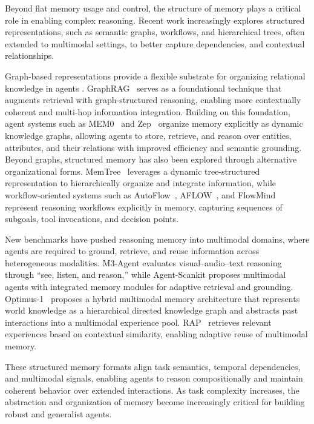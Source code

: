 Beyond flat memory usage and control, the structure of memory plays a critical role in enabling complex reasoning. Recent work increasingly explores structured representations, such as semantic graphs, workflows, and hierarchical trees, often extended to multimodal settings, to better capture dependencies, and contextual relationships.

Graph-based representations provide a flexible substrate for organizing relational knowledge in agents \cite{Ouyang2024RepoGraphEA}. GraphRAG~\cite{Edge2024FromLT} serves as a foundational technique that augments retrieval with graph-structured reasoning, enabling more contextually coherent and multi-hop information integration. Building on this foundation, agent systems such as MEM0~\cite{chhikara2025mem0} and Zep~\cite{rasmussen2025zep} organize memory explicitly as dynamic knowledge graphs, allowing agents to store, retrieve, and reason over entities, attributes, and their relations with improved efficiency and semantic grounding. Beyond graphs, structured memory has also been explored through alternative organizational forms. MemTree~\cite{rezazadeh2024isolated} leverages a dynamic tree-structured representation to hierarchically organize and integrate information, while workflow-oriented systems such as AutoFlow~\cite{Li2024AutoFlowAW}, AFLOW~\cite{zhang2024aflow}, and FlowMind~\cite{Zeng2023FlowMindAW} represent reasoning workflows explicitly in memory, capturing sequences of subgoals, tool invocations, and decision points.

New benchmarks have pushed reasoning memory into multimodal domains, where agents are required to ground, retrieve, and reuse information across heterogeneous modalities. M3-Agent \cite{long2025seeing} evaluates visual–audio–text reasoning through “see, listen, and reason,” while Agent-Scankit \cite{cheng2025agent} proposes multimodal agents with integrated memory modules for adaptive retrieval and grounding. Optimus-1~\cite{li2024optimus1} proposes a hybrid multimodal memory architecture that represents world knowledge as a hierarchical directed knowledge graph and abstracts past interactions into a multimodal experience pool. RAP~\cite{rap} retrieves relevant experiences based on contextual similarity, enabling adaptive reuse of multimodal memory.

These structured memory formats align task semantics, temporal dependencies, and multimodal signals, enabling agents to reason compositionally and maintain coherent behavior over extended interactions. As task complexity increases, the abstraction and organization of memory become increasingly critical for building robust and generalist agents.


